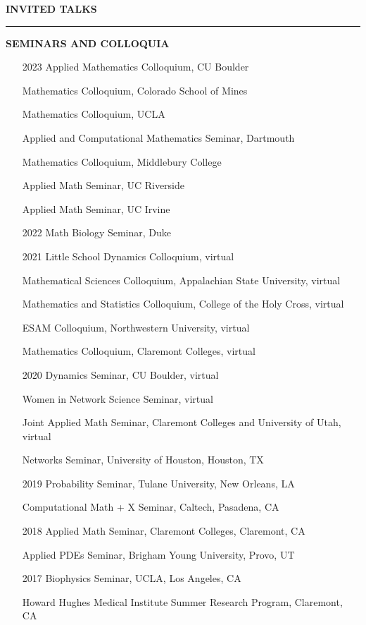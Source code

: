 \documentclass{resume} %
\renewenvironment{rSection}[1]{
\sectionskip
\textcolor{WinePurple}{\MakeUppercase{#1}}
\sectionlineskip
\hrule
\begin{list}{}{
\setlength{\leftmargin}{1.5em}
}
\item[]
}{
\end{list}
}
\begin{document}
\begin{rSection}{\bf Invited Talks}
\uppercase{\textbf{Seminars and Colloquia}}
\begin{itemize}
    \item[2023] Applied Mathematics Colloquium, CU Boulder
    \item[] Mathematics Colloquium, Colorado School of Mines
    \item[] Mathematics Colloquium, UCLA
    \item[] Applied and Computational Mathematics Seminar, Dartmouth
    \item[] Mathematics Colloquium, Middlebury College
    \item[] Applied Math Seminar, UC Riverside
    \item[] Applied Math Seminar, UC Irvine
    \item[2022] Math Biology Seminar, Duke
    \item[2021] Little School Dynamics Colloquium, virtual
    \item[] Mathematical Sciences Colloquium, Appalachian State University, virtual
    \item[] Mathematics and Statistics Colloquium, College of the Holy Cross, virtual 
    \item[] ESAM Colloquium, Northwestern University, virtual
    \item[] Mathematics Colloquium, Claremont Colleges, virtual
    \item[2020] Dynamics Seminar, CU Boulder, virtual
    \item[] Women in Network Science Seminar, virtual
    \item[] Joint Applied Math Seminar, Claremont Colleges and University of Utah, virtual
    \item[] Networks Seminar, University of Houston, Houston, TX
    \item[2019] Probability Seminar, Tulane University, New Orleans, LA
    \item[] Computational Math + X Seminar, Caltech, Pasadena, CA
    \item[2018] Applied Math Seminar, Claremont Colleges, Claremont, CA
    \item[] Applied PDEs Seminar, Brigham Young University, Provo, UT
    \item[2017] Biophysics Seminar, UCLA, Los Angeles, CA
    \item[] Howard Hughes Medical Institute Summer Research Program, Claremont, CA
\end{itemize}

\newpage


\end{rSection}
\end{document}

